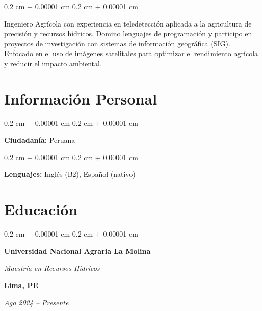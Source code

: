 \documentclass[10pt, letterpaper]{article}
\newenvironment{onecolentry}{
    \begin{adjustwidth}{
        0.2 cm + 0.00001 cm
    }{
        0.2 cm + 0.00001 cm
    }
}{
    \end{adjustwidth}
} %
\newenvironment{twocolentry}[2][]{
    \onecolentry
    \def\secondColumn{#2}
    \setcolumnwidth{\fill, 4.5 cm}
    \begin{paracol}{2}
}{
    \switchcolumn \raggedleft \secondColumn
    \end{paracol}
    \endonecolentry
} %
\let\hrefWithoutArrow\href
\renewcommand{\href}[2]{\hrefWithoutArrow{#1}{\ifthenelse{\equal{#2}{}}{ }{#2 }\raisebox{.15ex}{\footnotesize \faExternalLink*}}}
\begin{document}
        
        \begin{onecolentry}
            Ingeniero Agrícola con experiencia en teledetección aplicada a la agricultura de precisión y recursos hídricos. Domino lenguajes de programación y participo en proyectos de investigación con sistemas de información geográfica (SIG). Enfocado en el uso de imágenes satelitales para optimizar el rendimiento agrícola y reducir el impacto ambiental.
        \end{onecolentry}



    
    \section{Información Personal}


        \begin{onecolentry}
            \textbf{Ciudadanía:} Peruana
        \end{onecolentry}

        \vspace{0.2 cm}

        \begin{onecolentry}
            \textbf{Lenguajes:} Inglés (B2), Español (nativo)
        \end{onecolentry}


    \section{Educación}

        \begin{twocolentry}{
        \textbf{Lima, PE}    
            
        \textit{Ago 2024 – Presente}}
            \textbf{Universidad Nacional Agraria La Molina}

            \textit{Maestría en Recursos Hídricos}
        \end{twocolentry}
\end{document}
